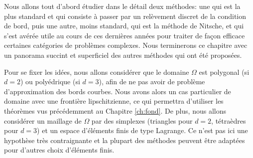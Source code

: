 \documentclass[11pt]{book}
\newenvironment{comments}{%
\begin{center}
 \color{blue}{
 {\bf Commentaire :}}

 \begin{tabular}{|p{0.8\textwidth}|}
 \hline
}{%
 \\ \hline \end{tabular}
 \end{center}
}
\begin{document}
Nous allons tout d'abord étudier dans le détail deux méthodes: une qui est la plus standard et qui consiste à passer par un relèvement discret de la condition de bord, puis une autre, moins standard, qui est la méthode de Nitsche, et qui s'est avérée utile au cours de ces dernières années pour traiter de façon efficace certaines catégories de problèmes complexes. Nous terminerons ce chapitre avec un panorama succint et superficiel des autres méthodes qui ont été proposées.

Pour se fixer les idées, nous allons considérer que le domaine $\Omega$ est polygonal (si $d=2$) ou polyédrique (si $d=3$), afin de ne pas avoir de problème d'approximation des bords courbes. Nous avons alors un cas particulier de domaine avec une frontière lipschitzienne, ce qui permettra d'utiliser les théorèmes vus précédemment au Chapitre \ref{ch:fond}.
De plus, nous allons considérer un maillage de $\Omega$ par des simplexes (triangles pour $d=2$, tétraèdres pour $d=3$) et un espace d'éléments finis de type Lagrange. Ce n'est pas ici une hypothèse très contraignante et la plupart des méthodes peuvent être adaptées pour d'autres choix d'éléments finis.

% 
% 
\end{document}
